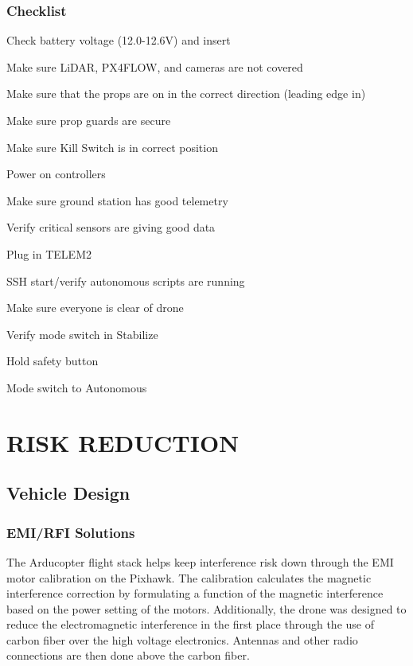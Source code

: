 \documentclass[12pt,letterpaper]{article}
\newenvironment{my_enumerate}{
	\begin{enumerate}
	\setlength{\itemsep}{1pt}
	\setlength{\parskip}{0pt}
	\setlength{\parsep}{0pt}}{\end{enumerate}
}
\begin{document}
		\subsubsection*{Checklist}
			\begin{my_enumerate}
				\item Check battery voltage (12.0-12.6V) and insert
				\item Make sure LiDAR, PX4FLOW, and cameras are not covered
				\item Make sure that the props are on in the correct direction (leading edge in)
				\item Make sure prop guards are secure
				\item Make sure Kill Switch is in correct position
				\item Power on controllers
				\item Make sure ground station has good telemetry
				\item Verify critical sensors are giving good data
				\item Plug in TELEM2
				\item SSH start/verify autonomous scripts are running
				\item Make sure everyone is clear of drone
				\item Verify mode switch in Stabilize
				\item Hold safety button
				\item Mode switch to Autonomous
			\end{my_enumerate}

\section*{RISK REDUCTION}
	\subsection*{Vehicle Design}
		\subsubsection*{EMI/RFI Solutions}
		The Arducopter flight stack helps keep interference risk down through the EMI motor calibration on the Pixhawk. The calibration calculates the magnetic interference correction by formulating a function of the magnetic interference based on the power setting of the motors. Additionally, the drone was designed to reduce the electromagnetic interference in the first place through the use of carbon fiber over the high voltage electronics. Antennas and other radio connections are then done above the carbon fiber. 
\end{document}
